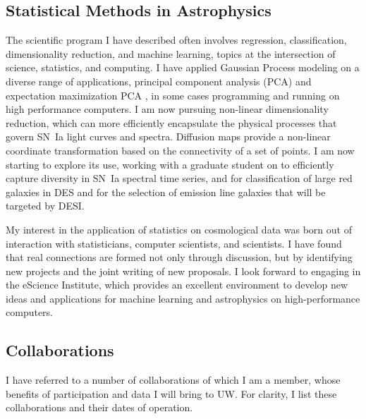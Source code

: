\documentclass{article}
\begin{document}
\subsection{Statistical Methods in Astrophysics}
The scientific program I have described often involves regression, classification, dimensionality reduction,
and machine learning, topics at the intersection of science, statistics, and computing.  I have applied Gaussian Process modeling
on a diverse range of applications, principal component
analysis (PCA) and expectation maximization PCA \cite{2012PhRvD..85l3530S,2013ApJ...766...84K,
2013PhRvD..87l3512H}, in some cases programming and running on high performance computers.
I am now pursuing non-linear dimensionality reduction, which can more efficiently encapsulate
the physical processes that govern SN~Ia light curves and spectra.
Diffusion maps provide a non-linear coordinate transformation based on the connectivity of a set of points.
I am now starting to explore its use, working with a graduate student on
to efficiently capture diversity in SN~Ia spectral time series, and for classification of large red galaxies in DES
and for the selection of emission line galaxies that will be targeted by DESI.

My interest in the application of statistics on cosmological data
was born out of interaction with statisticians, computer scientists,
and scientists. I have found that real connections are formed not only through discussion,
but by identifying new projects and the joint writing of new proposals.
I look forward to engaging in
the eScience Institute, which provides an excellent environment to develop new ideas and applications
for machine learning and astrophysics on high-performance computers.


\subsection{Collaborations}
I have referred to a number of collaborations of which I am a member, whose benefits of participation
and data  I will bring to UW.  For clarity, I list these collaborations and their dates of operation.
\end{document}
